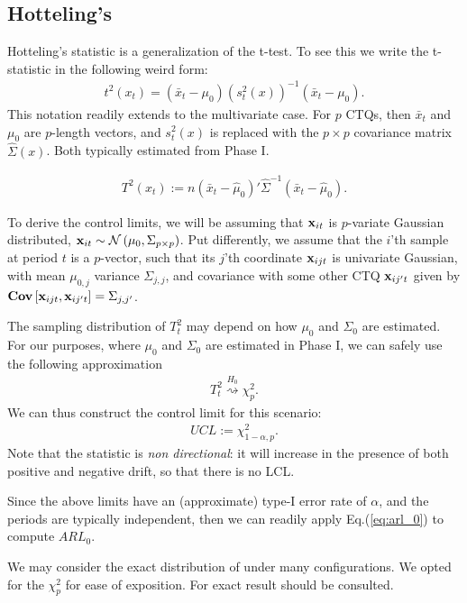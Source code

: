 \subsection{Hotteling's \tsq}
Hotteling's \tsq statistic is a generalization of the t-test.
To see this we write the t-statistic in the following weird form:
\begin{align}
	t^2(x_t)=(\bar{x}_t-\mu_0) (s^2_t(x))^{-1} (\bar{x}_t-\mu_0).
\end{align}
This notation readily extends to the multivariate case. 
For $p$ CTQs, then $\bar{x}_t$ and $\mu_0$ are $p$-length vectors, and $s^2_t(x)$ is replaced with the $p \times p$ covariance matrix $\hat{\Sigma}(x)$.
Both typically estimated from Phase I. 
\begin{definition}
\begin{align}
\label{eq:hotteling}
	T^2(x_t) := n (\bar{x}_t-\hat{\mu}_0)' \hat{\Sigma}^{-1} (\bar{x}_t-\hat{\mu}_0).
\end{align}
\end{definition}
To derive the control limits, we will be assuming that $\mathbf{x}_{it}$ is $p$-variate Gaussian distributed, $\mathbf{x}_{it}\sim \mathcal{N}\left(\mu_0, \Sigma_{p \times p}\right)$. 
Put differently, we assume that the $i$'th sample at period $t$ is a $p$-vector, such that its $j$'th coordinate $\mathbf{x}_{ijt}$ is univariate Gaussian, with mean $\mu_{0,j}$ variance $\Sigma_{j,j}$, and covariance with some other CTQ $\mathbf{x}_{ij't}$ given by $\mathbf{Cov} \left[ \mathbf{x}_{ijt},\mathbf{x}_{ij't} \right]=\Sigma_{j,j'}$. 

The sampling distribution of $T^2_t$ may depend on how $\mu_0$ and $\Sigma_0$ are estimated. 
For our purposes, where $\mu_0$ and $\Sigma_0$ are estimated in Phase I, we can safely use the following approximation
\begin{align}
	T^2_t \overset{H_0}{\rightsquigarrow }\chi^2_p.
\end{align}
We can thus construct the control limit for this scenario:
\begin{align}
	UCL:= \chi^2_{1-\alpha,p}.
\end{align}
Note that the \tsq statistic is \emph{non directional}: it will increase in the presence of both positive and negative drift, so that there is no LCL.

Since the above limits have an (approximate) type-I error rate of $\alpha$, and the periods are typically independent, then we can readily apply Eq.(\ref{eq:arl_0}) to compute $ARL_0$.

\begin{remark}
We may consider the exact distribution of \tsq under many configurations. 
We opted for the $\chi^2_p$ for ease of exposition. 
For exact result \cite[Ch.7]{qiu_introduction_2013} should be consulted. 
\end{remark}


